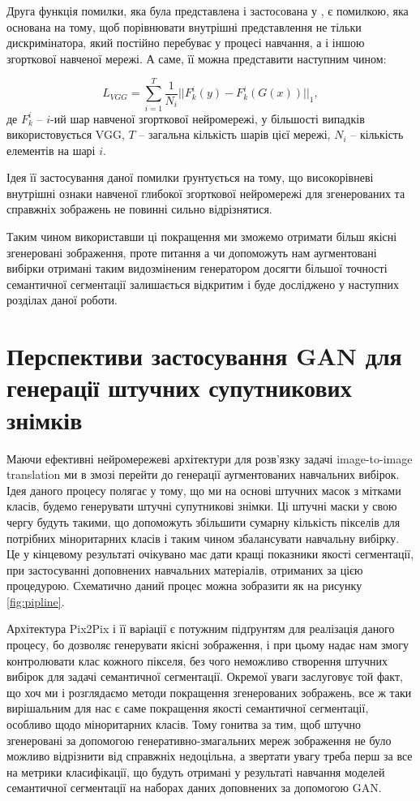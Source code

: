 Друга функція помилки, яка була представлена і застосована у
\cite{pix2pixHD}, є помилкою, яка основана на тому, щоб
порівнювати внутрішні представлення не тільки дискримінатора,
який постійно перебуває у процесі навчання, а і іншою згорткової
навченої мережі. А саме, її можна представити наступним чином:

\begin{equation} \label{eq:perceptual_loss}
    L_{VGG} = \sum\limits_{i=1}^T
    \frac{1}{N_i} || F^i_k(y) - F^i_k(G(x)) ||_1,
\end{equation}
де $F^i_k$ -- $i$-ий шар навченої згорткової нейромережі,
у більшості випадків використовується VGG,
$T$ -- загальна кількість шарів цієї мережі,
$N_i$ -- кількість елементів на шарі $i$.

Ідея її застосування даної помилки ґрунтується на тому, що
високорівневі внутрішні ознаки навченої глибокої згорткової
нейромережі для згенерованих та справжніх зображень не повинні
сильно відрізнятися.

Таким чином використавши ці покращення ми зможемо
отримати більш якісні згенеровані зображення, проте питання а
чи допоможуть нам аугментовані вибірки отримані таким видозміненим
генератором досягти більшої точності семантичної сегментації залишається
відкритим і буде досліджено у наступних розділах даної роботи.

\section{Перспективи застосування GAN для генерації штучних супутникових знімків}

Маючи ефективні нейромережеві архітектури для розв'язку задачі
image-to-image translation ми в змозі перейти до
генерації аугментованих навчальних вибірок. Ідея даного процесу
полягає у тому, що ми на основі штучних масок з мітками класів,
будемо генерувати штучні супутникові знімки. Ці штучні маски у
свою чергу будуть такими, що допоможуть збільшити сумарну кількість
пікселів для потрібних міноритарних класів і таким чином збалансувати
навчальну вибірку. Це у кінцевому результаті очікувано має дати
кращі показники якості сегментації, при застосуванні доповнених
навчальних матеріалів, отриманих за цією процедурою. Схематично даний процес
можна зобразити як на рисунку \ref{fig:pipline}.

Архітектура Pix2Pix і її варіації є потужним підґрунтям для
реалізація даного процесу, бо дозволяє генерувати якісні зображення,
і при цьому надає нам змогу контролювати клас кожного пікселя,
без чого неможливо створення штучних вибірок для задачі семантичної сегментації.
Окремої уваги заслуговує той факт, що хоч ми і розглядаємо
методи покращення згенерованих зображень, все ж таки
вирішальним для нас є саме покращення якості семантичної сегментації,
особливо щодо міноритарних класів. Тому гонитва за тим, щоб
штучно згенеровані за допомогою генеративно-змагальних мереж
зображення не було можливо відрізнити від справжніх недоцільна,
а звертати увагу треба перш за все на метрики класифікації,
що будуть отримані у результаті навчання моделей семантичної
сегментації на наборах даних доповнених за допомогою GAN.

